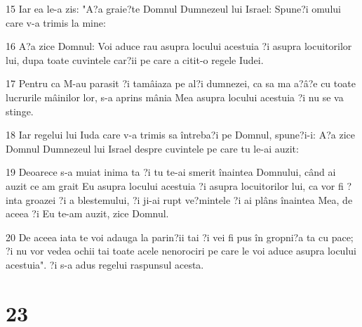 \par 15 Iar ea le-a zis: "A?a graie?te Domnul Dumnezeul lui Israel: Spune?i omului care v-a trimis la mine:
\par 16 A?a zice Domnul: Voi aduce rau asupra locului acestuia ?i asupra locuitorilor lui, dupa toate cuvintele car?ii pe care a citit-o regele Iudei.
\par 17 Pentru ca M-au parasit ?i tamâiaza pe al?i dumnezei, ca sa ma a?â?e cu toate lucrurile mâinilor lor, s-a aprins mânia Mea asupra locului acestuia ?i nu se va stinge.
\par 18 Iar regelui lui Iuda care v-a trimis sa întreba?i pe Domnul, spune?i-i: A?a zice Domnul Dumnezeul lui Israel despre cuvintele pe care tu le-ai auzit:
\par 19 Deoarece s-a muiat inima ta ?i tu te-ai smerit înaintea Domnului, când ai auzit ce am grait Eu asupra locului acestuia ?i asupra locuitorilor lui, ca vor fi ?inta groazei ?i a blestemului, ?i ji-ai rupt ve?mintele ?i ai plâns înaintea Mea, de aceea ?i Eu te-am auzit, zice Domnul.
\par 20 De aceea iata te voi adauga la parin?ii tai ?i vei fi pus în gropni?a ta cu pace; ?i nu vor vedea ochii tai toate acele nenorociri pe care le voi aduce asupra locului acestuia". ?i s-a adus regelui raspunsul acesta.

\chapter{23}

